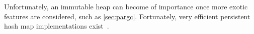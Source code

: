 Unfortunately, an immutable heap can become of importance once more exotic features are considered, such as \autoref{sec:pargc}.
Fortunately, very efficient persistent hash map implementations exist~\cite{bagwell2001ideal}.


